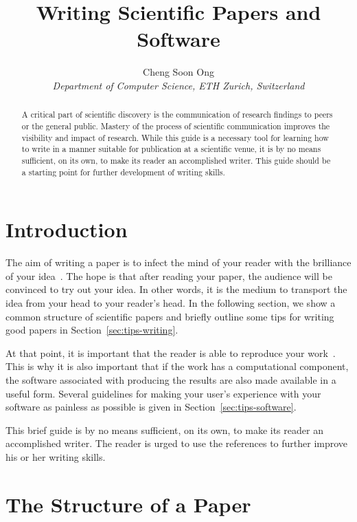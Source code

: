 \documentclass[10pt,conference,compsocconf]{IEEEtran}
\begin{document}
\title{Writing Scientific Papers and Software}

\author{
  Cheng Soon Ong\\
  \textit{Department of Computer Science, ETH Zurich, Switzerland}
}

\maketitle

\begin{abstract}
  A critical part of scientific discovery is the
  communication of research findings to peers or the general public.
  Mastery of the process of scientific communication improves the
  visibility and impact of research. While this guide is a necessary
  tool for learning how to write in a manner suitable for publication
  at a scientific venue, it is by no means sufficient, on its own, to
  make its reader an accomplished writer. 
  This guide should be a starting point for further development of 
  writing skills.
\end{abstract}

\section{Introduction}

The aim of writing a paper is to infect the mind of your reader with
the brilliance of your idea~\cite{jones08}. 
The hope is that after reading your
paper, the audience will be convinced to try out your idea. In other
words, it is the medium to transport the idea from your head to your
reader's head. 
In the following
section, we show a common structure of scientific papers and briefly
outline some tips for writing good papers in
Section~\ref{sec:tips-writing}.

At that
point, it is important that the reader is able to reproduce your
work~\cite{schwab00,wavelab,gentleman05}. This is why it is also
important that if the work has a computational component, the software
associated with producing the results are also made available in a
useful form. Several guidelines for making your user's experience with
your software as painless as possible is given in
Section~\ref{sec:tips-software}.

This brief guide is by no means sufficient, on its own, to
make its reader an accomplished writer. The reader is urged to use the
references to further improve his or her writing skills.

\section{The Structure of a Paper}
\label{sec:structure-paper}
\end{document}
